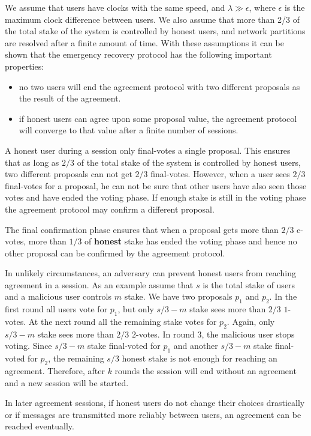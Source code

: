 We assume that users have clocks with the same speed, and $\lambda \gg \epsilon$, where $\epsilon$ is the maximum
clock difference between users. We also assume that more than 2/3 of the total stake of the system is controlled
by honest users, and network partitions are resolved after a finite amount of time. With these assumptions it can be
shown that the emergency recovery protocol has the following important properties:
\begin{itemize}
    \item no two users will end the agreement protocol with two different proposals as the result of the agreement.
    \item if honest users can agree upon some proposal value, the agreement protocol will converge to that value
    after a finite number of sessions.
\end{itemize}

A honest user during a session only final-votes a single proposal. This ensures that as long as $2/3$ of the total
stake of the system is controlled by honest users, two different proposals can not get $2/3$ final-votes. However, when
a user sees $2/3$ final-votes for a proposal, he can not be sure that other users have also seen those votes and have
ended the voting phase. If enough stake is still in the voting phase the agreement protocol may confirm a
different proposal.

The final confirmation phase ensures that when a proposal gets more than $2/3$ c-votes, more than $1/3$ of
\textbf{honest} stake has ended the voting phase and hence no other proposal can be confirmed by the agreement protocol.

In unlikely circumstances, an adversary can prevent honest users from reaching agreement in a session. As an example
assume that $s$ is the total stake of users and a malicious user controls $m$ stake. We have two proposals $p_1$ and
$p_2$. In the first round all users vote for $p_1$, but only $s/3 - m$ stake sees more than $2/3$ $1$-votes. At the
next round all the remaining stake votes for $p_2$. Again, only $s/3 - m$ stake sees more than $2/3$
$2$-votes. In round $3$, the malicious user stops voting. Since $s/3 - m$ stake final-voted for $p_1$ and another
$s/3 - m$ stake final-voted for $p_2$, the remaining $s/3$ honest stake is not enough for reaching an agreement.
Therefore, after $k$ rounds the session will end without an agreement and a new session will be started.

In later agreement sessions, if honest users do not change their choices drastically or if messages are transmitted
more reliably between users, an agreement can be reached eventually.

